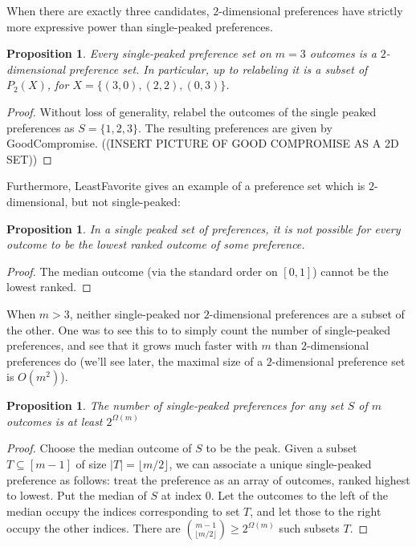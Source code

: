 \documentclass[12pt]{article}
\newtheorem{proposition}[theorem]{Proposition}
\newcommand{\1}[1]{\mathds{1}[{#1}]}
\begin{document}
  When there are exactly three candidates, $2$-dimensional
  preferences have strictly more expressive power than
  single-peaked preferences.
  \begin{proposition}
    Every single-peaked preference set on $m=3$ outcomes
    is a $2$-dimensional preference set. In particular,
    up to relabeling it is a subset of $P_2(X)$, for
    $X = \{ (3,0), (2,2), (0,3) \}$.
  \end{proposition}
  \begin{proof}
    Without loss of generality, relabel the outcomes
    of the single peaked preferences as $S = \{1,2,3\}$.
    The resulting preferences are given by {\sc GoodCompromise}.
    ((INSERT PICTURE OF GOOD COMPROMISE AS A 2D SET))
  \end{proof}
  Furthermore, {\sc LeastFavorite} gives an example of a preference set
  which is $2$-dimensional, but not single-peaked:
  \begin{proposition}
    In a single peaked set of preferences, it is not possible
    for every outcome to be the lowest ranked outcome of some preference.
  \end{proposition}
  \begin{proof}
    The median outcome (via the standard order on $[0,1]$)
    cannot be the lowest ranked.
  \end{proof}

  When $m>3$, neither single-peaked nor $2$-dimensional preferences
  are a subset of the other. One was to see this to to simply
  count the number of single-peaked preferences, and see that it
  grows much faster with $m$ than $2$-dimensional preferences do
  (we'll see later, the maximal size of a $2$-dimensional
  preference set is $O(m^2)$).
  \begin{proposition}
    The number of single-peaked preferences for any set $S$ of $m$ outcomes
    is at least $2^{\Omega(m)}$
  \end{proposition}
  \begin{proof}
    Choose the median outcome of $S$ to be the peak.
    Given a subset $T\subseteq [m-1]$ of size $|T| = \lfloor m/2\rfloor$,
    we can associate a
    unique single-peaked preference as follows:
    treat the preference as an array of outcomes, ranked highest to lowest.
    Put the median of $S$ at index $0$.
    Let the outcomes to the left of the median occupy the indices corresponding
    to set $T$, and let those to the right occupy the other indices.
    There are ${m-1 \choose \lfloor m/2\rfloor } \ge 2^{\Omega(m)}$ such
    subsets $T$.
  \end{proof}
\end{document}
